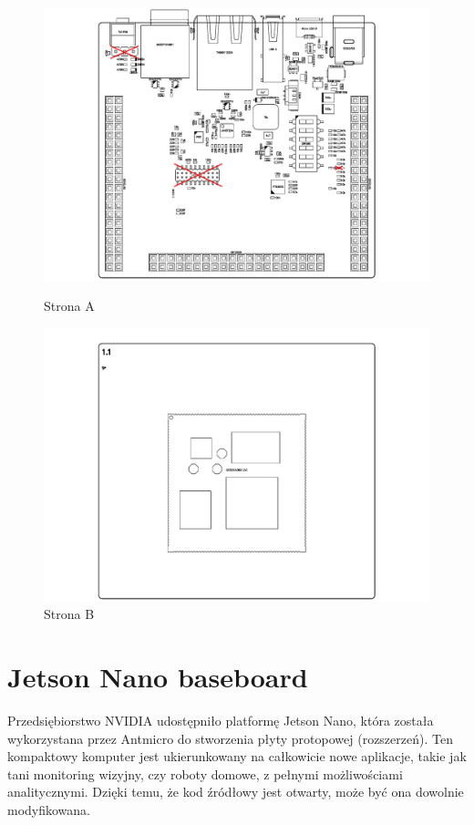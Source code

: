 \begin{figure}[!htb]
	\begin{minipage}{0.5\textwidth}
		\centering
		\includegraphics[width=\linewidth,clip, trim=3cm 0.2cm 3cm 0.1cm]{./chapters/chapter5/chilli_A.pdf}
		\caption{Strona A}\label{chilli:StronaA}
	\end{minipage}\hfill
	\begin{minipage}{0.5\textwidth}
		\centering
		\includegraphics[width=\linewidth,clip, trim=3cm 0.1cm 3cm 0.1cm]{./chapters/chapter5/chilli_B.pdf}
		\caption{Strona B}\label{chilli:StronaB}
	\end{minipage}
\end{figure}

\section{Jetson Nano baseboard}
Przedsiębiorstwo NVIDIA udostępniło platformę Jetson Nano, która została wykorzystana przez Antmicro do stworzenia płyty protopowej (rozszerzeń).
Ten kompaktowy komputer jest ukierunkowany na całkowicie nowe aplikacje, takie jak tani monitoring wizyjny, czy roboty domowe, z pełnymi możliwościami analitycznymi.
Dzięki temu, że kod źródłowy jest otwarty, może być ona dowolnie modyfikowana.

